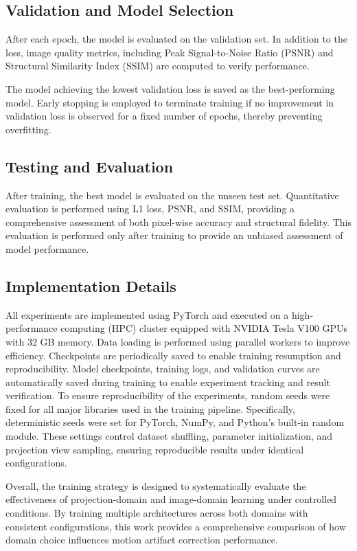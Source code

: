 \subsection{Validation and Model Selection}

After each epoch, the model is evaluated on the validation set. In addition to the loss, image quality metrics, including Peak Signal-to-Noise Ratio (PSNR) and Structural Similarity Index (SSIM) are computed to verify performance.

 The model achieving the lowest validation loss is saved as the best-performing model. Early stopping is employed to terminate training if no improvement in validation loss is observed for a fixed number of epochs, thereby preventing overfitting.

 \subsection{Testing and  Evaluation}

After training, the best model is evaluated on the unseen test set. Quantitative evaluation is performed using L1 loss, PSNR, and SSIM, providing a comprehensive assessment of both pixel-wise accuracy and structural fidelity. This evaluation is performed only after training to provide an unbiased assessment of model performance. 

 \subsection{Implementation Details}

All experiments are implemented using PyTorch and executed on a high-performance computing (HPC) cluster equipped with NVIDIA Tesla V100 GPUs with 32 GB memory. Data loading is performed using parallel workers to improve efficiency. Checkpoints are periodically saved to enable training resumption and reproducibility.  Model checkpoints, training logs, and validation curves are automatically saved during training to enable experiment tracking and result verification. 
To ensure reproducibility of the experiments, random seeds were fixed for all major libraries used in the training pipeline. Specifically, deterministic seeds were set for PyTorch, NumPy, and Python’s built-in random module. These settings control dataset shuffling, parameter initialization, and projection view sampling, ensuring reproducible results under identical configurations. 

Overall, the training strategy is designed to systematically evaluate the effectiveness of projection-domain and image-domain learning under controlled conditions. By training multiple architectures across both domains with consistent configurations, this work provides a comprehensive comparison of how domain choice influences motion artifact correction performance.

